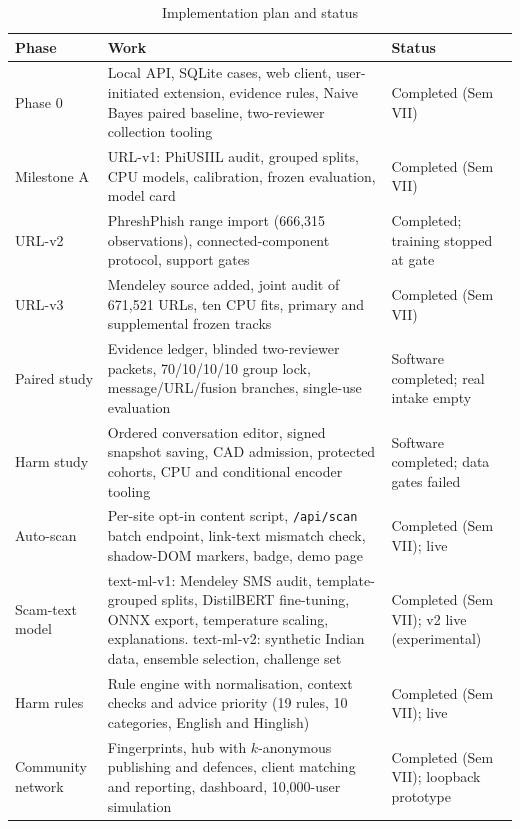 \begin{table}[!htbp]
\centering
\small
\renewcommand{\arraystretch}{1.2}
\caption{Implementation plan and status}
\label{tab:plan}
\begin{tabular}{|>{\raggedright\arraybackslash}p{2.3cm}|>{\raggedright\arraybackslash}p{8.9cm}|>{\raggedright\arraybackslash}p{3.0cm}|}
\hline
\textbf{Phase} & \textbf{Work} & \textbf{Status} \\ \hline
Phase 0 & Local API, SQLite cases, web client, user-initiated extension, evidence rules, Naive Bayes paired baseline, two-reviewer collection tooling & Completed (Sem VII) \\ \hline
Milestone A & URL-v1: PhiUSIIL audit, grouped splits, CPU models, calibration, frozen evaluation, model card & Completed (Sem VII) \\ \hline
URL-v2 & PhreshPhish range import (666,315 observations), connected-component protocol, support gates & Completed; training stopped at gate \\ \hline
URL-v3 & Mendeley source added, joint audit of 671,521 URLs, ten CPU fits, primary and supplemental frozen tracks & Completed (Sem VII) \\ \hline
Paired study & Evidence ledger, blinded two-reviewer packets, 70/10/10/10 group lock, message/URL/fusion branches, single-use evaluation & Software completed; real intake empty \\ \hline
Harm study & Ordered conversation editor, signed snapshot saving, CAD admission, protected cohorts, CPU and conditional encoder tooling & Software completed; data gates failed \\ \hline
Auto-scan & Per-site opt-in content script, \texttt{/api/scan} batch endpoint, link-text mismatch check, shadow-DOM markers, badge, demo page & Completed (Sem VII); live \\ \hline
Scam-text model & text-ml-v1: Mendeley SMS audit, template-grouped splits, DistilBERT fine-tuning, ONNX export, temperature scaling, explanations. text-ml-v2: synthetic Indian data, ensemble selection, challenge set & Completed (Sem VII); v2 live (experimental) \\ \hline
Harm rules & Rule engine with normalisation, context checks and advice priority (19 rules, 10 categories, English and Hinglish) & Completed (Sem VII); live \\ \hline
Community network & Fingerprints, hub with $k$-anonymous publishing and defences, client matching and reporting, dashboard, 10,000-user simulation & Completed (Sem VII); loopback prototype \\ \hline

\end{tabular}
\end{table}
